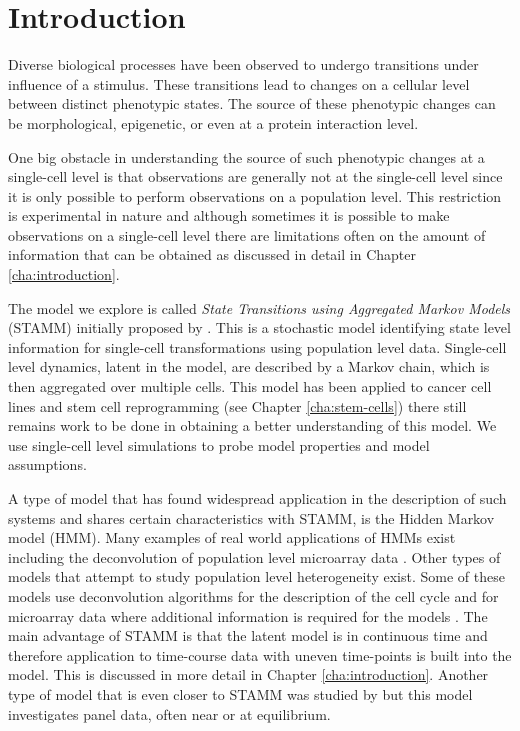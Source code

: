 
\section{Introduction}
\label{sec:intro-stamm}

Diverse biological processes have been observed to undergo transitions under influence of a stimulus. These transitions lead to changes on a cellular level between distinct phenotypic states. The source of these phenotypic changes can be morphological, epigenetic, or even at a protein interaction level.

One big obstacle in understanding the source of such phenotypic changes at a single-cell level is that observations are generally not at the single-cell level since it is only possible to perform observations on a population level. This restriction is experimental in nature and although sometimes it is possible to make observations on a single-cell level there are limitations often on the amount of information that can be obtained as discussed in detail in Chapter \ref{cha:introduction}.

The model we explore is called \emph{State Transitions using Aggregated Markov Models} (STAMM) initially proposed by \cite{Armond:2013}. This is a stochastic model identifying  state level information for single-cell transformations using population level data. Single-cell level dynamics, latent in the model, are described by a Markov chain, which is then aggregated over multiple cells. This model has been applied to cancer cell lines  \citep{Casale:2013} and stem cell reprogramming (see Chapter \ref{cha:stem-cells}) there still remains work to be done in obtaining a better understanding of this model. We use single-cell level simulations to probe model properties and model assumptions.

A type of model that has found widespread application in the description of such systems and shares certain characteristics with STAMM, is the Hidden Markov model (HMM). Many examples of real world applications of HMMs exist including the deconvolution of population level microarray data \citep{Roy:2006ik}. Other types of models that attempt to study population level heterogeneity exist. Some of these models use deconvolution algorithms for the description of the cell cycle and for microarray data where additional information is required for the models \citep{Bar-Joseph04082004, BarJoseph:2008bx}. The main advantage of STAMM is that the latent model is in continuous time and therefore application to time-course data with uneven time-points is built into the model. This is discussed in more detail in Chapter \ref{cha:introduction}. Another type of model that is even closer to STAMM was studied by \cite{Kalbfleisch:1983vd} but this model investigates panel data, often near or at equilibrium.

